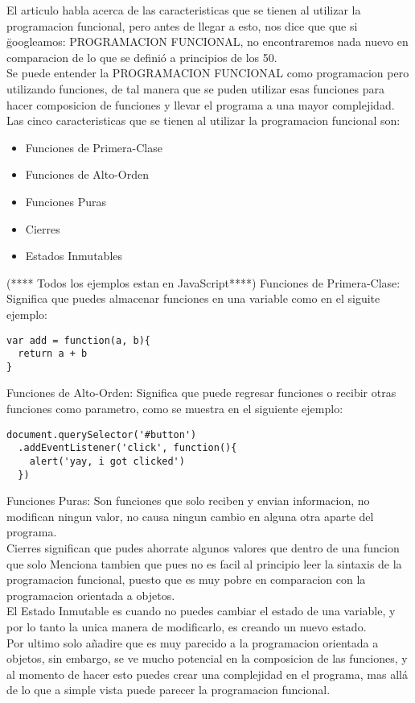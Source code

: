 \documentclass{report}%
\begin{document}
\begin{multicols}{2}
{\normalsize
El articulo habla acerca de las caracteristicas que se tienen al utilizar la programacion funcional, pero antes de llegar a esto, nos dice que que si \"{googleamos: PROGRAMACION FUNCIONAL}, no encontraremos nada nuevo en comparacion de lo que se definió a principios de los 50.\\
Se puede entender la PROGRAMACION FUNCIONAL como programacion pero utilizando funciones, de tal manera que se puden utilizar esas funciones para hacer composicion de funciones y llevar el programa a una mayor complejidad.
Las cinco caracteristicas que se tienen al utilizar la programacion funcional son:\\
\begin{itemize}
  \item Funciones de Primera-Clase
  \item Funciones de Alto-Orden
  \item Funciones Puras
  \item Cierres
  \item Estados Inmutables
\end{itemize}
(**** Todos los ejemplos estan en JavaScript****)
 Funciones de Primera-Clase: Significa que puedes almacenar funciones en una variable como en el siguite ejemplo:\\
\begin{lstlisting}[JavaScript]
var add = function(a, b){
  return a + b
} 
\end{lstlisting}
 Funciones de Alto-Orden: Significa que puede regresar funciones o recibir otras funciones como parametro, como se muestra en el siguiente ejemplo:\\
 \begin{lstlisting}[JavaScript]
 document.querySelector('#button')
  .addEventListener('click', function(){
    alert('yay, i got clicked')
  }) 
 \end{lstlisting}
 Funciones Puras: Son funciones que solo reciben y envian informacion, no modifican ningun valor, no causa ningun cambio en alguna otra aparte del programa.\\
 Cierres significan que pudes ahorrate algunos valores que dentro de una funcion que solo 
Menciona tambien que pues no es facil al principio leer la sintaxis de la programacion funcional, puesto que es muy pobre en comparacion con la programacion orientada a objetos.\\

El Estado Inmutable es cuando no puedes cambiar el estado de una variable, y por lo tanto la unica manera de modificarlo, es creando un nuevo estado.\\

Por ultimo solo añadire que es muy parecido a la programacion orientada a objetos, sin embargo, se ve mucho potencial en la composicion de las funciones, y al momento de hacer esto puedes crear una complejidad en el programa, mas allá de lo que a simple vista puede parecer la programacion funcional.
}
\end{multicols}
\newpage
\thispagestyle{plain}
\\
\end{document}
